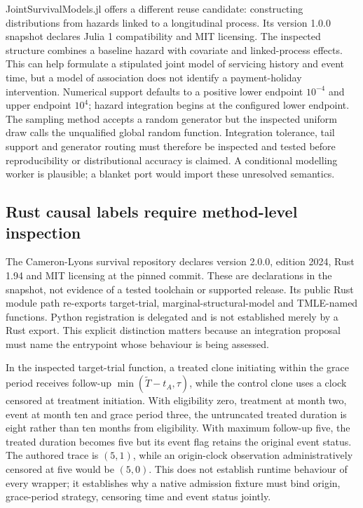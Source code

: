 JointSurvivalModels.jl offers a different reuse candidate: constructing distributions
from hazards linked to a longitudinal process. Its version 1.0.0 snapshot declares
Julia 1 compatibility and MIT licensing. The inspected structure combines a baseline
hazard with covariate and linked-process effects. This can help formulate a stipulated
joint model of servicing history and event time, but a model of association does not
identify a payment-holiday intervention. Numerical support defaults to a positive
lower endpoint $10^{-4}$ and upper endpoint $10^4$; hazard integration begins at
the configured lower endpoint. The sampling method accepts a random generator but
the inspected uniform draw calls the unqualified global random function. Integration
tolerance, tail support and generator routing must therefore be inspected and tested
before reproducibility or distributional accuracy is claimed. A conditional modelling
worker is plausible; a blanket port would import these unresolved semantics.
\citep{exec24_survivalother_juliajoint}

\subsection{Rust causal labels require method-level inspection}
The Cameron-Lyons survival repository declares version 2.0.0, edition 2024,
Rust 1.94 and MIT licensing at the pinned commit. These are declarations in the
snapshot, not evidence of a tested toolchain or supported release. Its public Rust
module path re-exports target-trial, marginal-structural-model and TMLE-named
functions. Python registration is delegated and is not established merely by a
Rust export. This explicit distinction matters because an integration proposal must
name the entrypoint whose behaviour is being assessed.\citep{exec24_survivalother_rustcore}

In the inspected target-trial function, a treated clone initiating within the grace
period receives follow-up $\min(\widetilde T-t_A,\tau)$, while the control clone
uses a clock censored at treatment initiation. With eligibility zero, treatment at
month two, event at month ten and grace period three, the untruncated treated duration
is eight rather than ten months from eligibility. With maximum follow-up five, the
treated duration becomes five but its event flag retains the original event status.
The authored trace is $(5,1)$, while an origin-clock observation administratively
censored at five would be $(5,0)$. This does not establish runtime behaviour of
every wrapper; it establishes why a native admission fixture must bind origin,
grace-period strategy, censoring time and event status jointly.
\citep{exec24_survivalother_rustcore,exec24_survivalother_reference}

